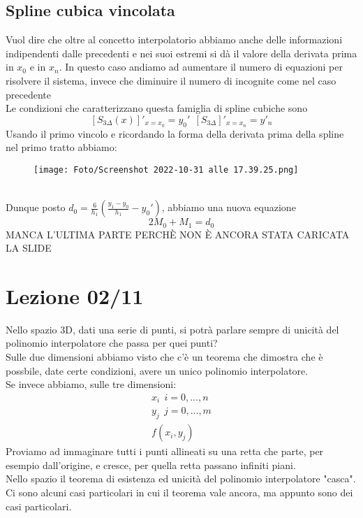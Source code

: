 \documentclass[a4paper, portrait]{book}
\numberwithin{equation}{chapter} %
\begin{document}
\section*{Spline cubica vincolata}
Vuol dire che oltre al concetto interpolatorio abbiamo anche delle informazioni indipendenti dalle precedenti e nei suoi estremi si dà il valore della derivata prima in $x_0$ e in $x_n$. In questo caso andiamo ad aumentare il numero di equazioni per risolvere il sistema, invece che diminuire il numero di incognite come nel caso precedente\\
Le condizioni che caratterizzano questa famiglia di spline cubiche sono
\begin{equation}
    \left[S_{3\Delta}(x)\right]'_{x=x_0} = y_0' \ \ \left[S_{3\Delta}\right]'_{x=x_n}=y'_n
\end{equation}
Usando il primo vincolo e ricordando la forma della derivata prima della spline nel primo tratto abbiamo:
\begin{figure}[h!]
    \centering
    \texttt{[image: Foto/Screenshot 2022-10-31 alle 17.39.25.png]}
    \caption{}
\end{figure}
\\Dunque posto $d_0 = \frac{6}{h_1}\left(\frac{y_1-y_0}{h_1}-y_0'\right)$, abbiamo una nuova equazione
\begin{equation}
    2M_0+M_1 = d_0
\end{equation}
{\Huge MANCA L'ULTIMA PARTE PERCHÈ NON È ANCORA STATA CARICATA LA SLIDE}
\chapter{Lezione 02/11}
Nello spazio 3D, dati una serie di punti, si potrà parlare sempre di unicità del polinomio interpolatore che passa per quei punti?\\
Sulle due dimensioni abbiamo visto che c'è un teorema che dimostra che è possbile, date certe condizioni, avere un unico polinomio interpolatore.\\
Se invece abbiamo, sulle tre dimensioni:
\begin{gather}
    x_i \ \ i = 0,...,n\\
    y_j \ \ j = 0,...,m\\
    f(x_i,y_j)
\end{gather}
Proviamo ad immaginare tutti i punti allineati su una retta che parte, per esempio dall'origine, e cresce, per quella retta passano infiniti piani.\\
Nello spazio il teorema di esistenza ed unicità del polinomio interpolatore "casca".\\
Ci sono alcuni casi particolari in cui il teorema vale ancora, ma appunto sono dei casi particolari.
\end{document}
